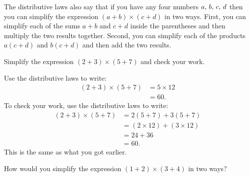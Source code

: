 \documentclass[a4paper,oneside,12pt]{article}
\begin{document}
The distributive laws also say that if you have any four numbers
${a},\, {b},\, {c},\, {d}$ then you can simplify the expression
$(a + b) \times (c + d)$ in two ways.  First, you can simplify each of
the sums $a + b$ and $c + d$ inside the parentheses and then multiply
the two results together.  Second, you can simplify each of the
products $a(c + d)$ and $b(c + d)$ and then add the two results.

\begin{example}
Simplify the expression $(2 + 3) \times (5 + 7)$ and check your work.
\end{example}

\begin{solution}
Use the distributive laws to write:
\begin{align*}
(2 + 3) \times (5 + 7)
&=
5 \times 12 \\[4pt]
&=
60.
\end{align*}
To check your work, use the distributive laws to write:
\begin{align*}
(2 + 3) \times (5 + 7)
&=
2(5 + 7) + 3(5 + 7) \\[4pt]
&=
(2 \times 12) + (3 \times 12) \\[4pt]
&=
24 + 36 \\[4pt]
&=
60.
\end{align*}
This is the same as what you got earlier.
\end{solution}

\begin{exercise}
How would you simplify the expression $(1 + 2) \times (3 + 4)$ in two
ways?
\end{exercise}

\end{document}
